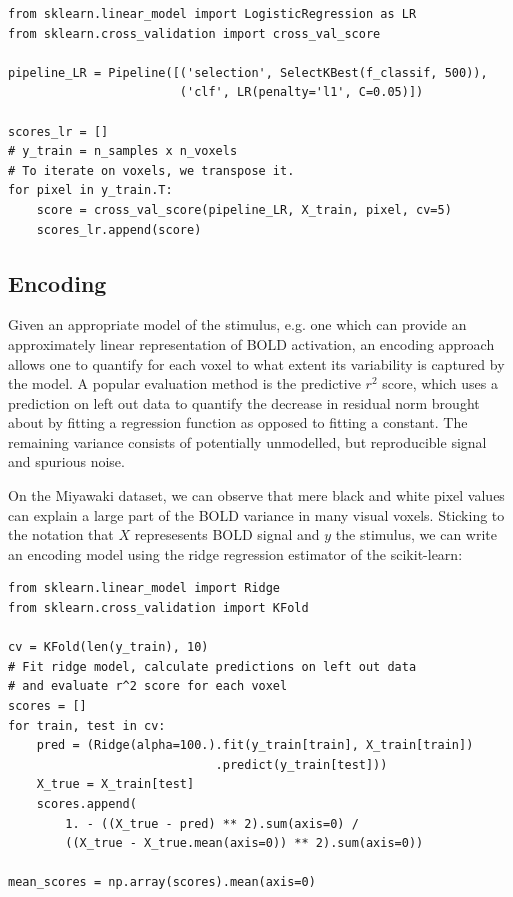 \documentclass{frontiersSCNS} %
\begin{document}
\begin{lstlisting}
from sklearn.linear_model import LogisticRegression as LR
from sklearn.cross_validation import cross_val_score

pipeline_LR = Pipeline([('selection', SelectKBest(f_classif, 500)),
                        ('clf', LR(penalty='l1', C=0.05)])

scores_lr = []
# y_train = n_samples x n_voxels
# To iterate on voxels, we transpose it.
for pixel in y_train.T:
    score = cross_val_score(pipeline_LR, X_train, pixel, cv=5)
    scores_lr.append(score)
\end{lstlisting}




\subsection{Encoding}
Given an appropriate model of the stimulus, e.g. one which can provide an
approximately linear representation of BOLD activation, an encoding approach
allows one to quantify for each voxel to what extent its variability is captured
by the model. A popular evaluation method is the predictive \(r^2\) score, which
uses a prediction on left out data to quantify the decrease in residual norm 
brought about by fitting a regression function as opposed to fitting a constant. 
The remaining variance consists of potentially unmodelled, but reproducible signal
and spurious noise.

On the Miyawaki dataset, we can observe that mere black and white pixel values
can explain a large part of the BOLD variance in many visual voxels. Sticking
to the notation that \(X\) represesents BOLD signal and \(y\) the stimulus, we
can write an encoding model using the ridge regression estimator of the scikit-learn:

\begin{lstlisting}
from sklearn.linear_model import Ridge
from sklearn.cross_validation import KFold

cv = KFold(len(y_train), 10)
# Fit ridge model, calculate predictions on left out data
# and evaluate r^2 score for each voxel
scores = []
for train, test in cv:
    pred = (Ridge(alpha=100.).fit(y_train[train], X_train[train])
                             .predict(y_train[test]))
    X_true = X_train[test]
    scores.append(
        1. - ((X_true - pred) ** 2).sum(axis=0) /
        ((X_true - X_true.mean(axis=0)) ** 2).sum(axis=0))
    
mean_scores = np.array(scores).mean(axis=0)
\end{lstlisting}
\end{document}

